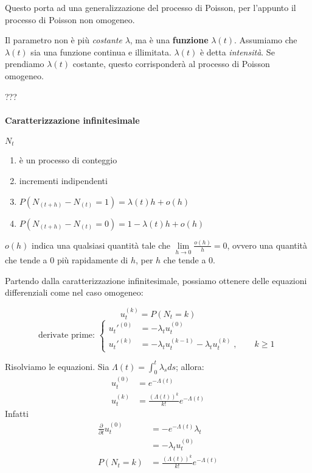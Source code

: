 \documentclass[a4paper,12pt]{book}
\begin{document}
Questo porta ad una generalizzazione del processo di Poisson, per l'appunto il processo di Poisson non omogeneo. 

Il parametro non è più \textit{costante} $\lambda$, ma è una \textbf{funzione} $\lambda(t)$. Assumiamo che $\lambda(t)$ sia una funzione continua e illimitata. $\lambda(t)$ è detta \textit{intensità}. Se prendiamo $\lambda(t)$ costante, questo corrisponderà al processo di Poisson omogeneo. 

??? \paragraph{Caratterizzazione infinitesimale} %
$ N_t $
\begin{enumerate}
	\item è un processo di conteggio
	\item incrementi indipendenti
	\item $ P(N_{(t+h)} - N_{(t)} = 1) = \lambda(t) h + o(h) $
	\item $ P(N_{(t+h)} - N_{(t)} = 0) = 1 - \lambda(t) h + o(h) $
\end{enumerate}

$ o(h) $ indica una qualsiasi quantità tale che $ \lim\limits_{h \to 0} \frac{o(h)}{h} = 0 $, ovvero una quantità che tende a 0 più rapidamente di $ h $, per $ h $ che tende a 0. 

Partendo dalla caratterizzazione infinitesimale, possiamo ottenere delle equazioni differenziali come nel caso omogeneo:

$$ u_t^{(k)} = P(N_t = k) $$
$$ \text{derivate prime: } \begin{cases}
	u_t'^{(0)} & = -\lambda_t u_t^{(0)} \\
	u_t'^{(k)} & = -\lambda_t u_t^{(k-1)} - \lambda_tu_t^{(k)} \;, \qquad k \ge 1
\end{cases} $$

Risolviamo le equazioni. Sia $\Lambda(t) = \int_{0}^{t} \lambda_s ds$; allora:
\begin{align*}
	u_t^{(0)} & = e^{-\Lambda(t)} \\
	u_t^{(k)} & = \frac{(\Lambda(t))^k}{k!} e^{-\Lambda(t)} 
\end{align*}
Infatti 
\begin{align*}
	\frac{\partial}{\partial t} u_t^{(0)} & = -e^{-\Lambda(t)} \lambda_t \\
	& = -\lambda_t u_t^{(0)} \\
	P(N_t = k) & = \frac{(\Lambda(t))^k}{k!} e^{-\Lambda(t)}
\end{align*}
\end{document}
